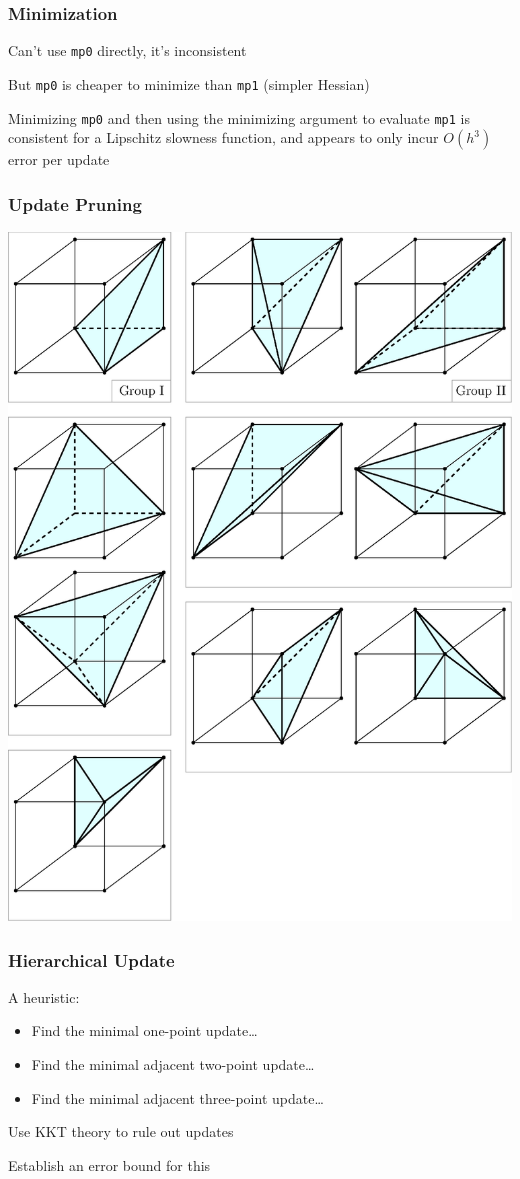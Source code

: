 \documentclass{beamer}
\begin{document}
\begin{frame}
  \frametitle{Minimization}

  Can't use \texttt{mp0} directly, it's inconsistent

  \vspace{1em}

  But \texttt{mp0} is cheaper to minimize than \texttt{mp1} (simpler
  Hessian)

  \vspace{1em}

  Minimizing \texttt{mp0} and then using the minimizing argument to
  evaluate \texttt{mp1} is consistent for a Lipschitz slowness function,
  and appears to only incur $O(h^3)$ error per update
\end{frame}

\begin{frame}
  \frametitle{Update Pruning}

  \begin{center}
    \includegraphics[width=0.56\linewidth]{tetra-by-group.eps}
  \end{center}
\end{frame}

\begin{frame}
  \frametitle{Hierarchical Update}

  A heuristic:
  \begin{itemize}
  \item Find the minimal one-point update\ldots
  \item Find the minimal adjacent two-point update\ldots
  \item Find the minimal adjacent three-point update\dots
  \end{itemize}
  
  \vspace{1em}

  Use KKT theory to rule out updates

  \vspace{1em}

  Establish an error bound for this
\end{frame}
\end{document}
